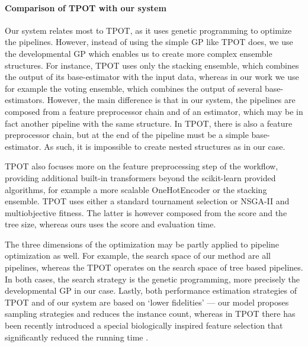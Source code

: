 \paragraph{Comparison of TPOT with our system}


Our system relates most to TPOT, as it uses genetic programming to optimize
the pipelines. However, instead of using the simple GP like TPOT does, we use
the developmental GP which enables us to create more complex ensemble
structures. For instance, TPOT uses only the stacking ensemble, which combines the
output of its base-estimator with the input data, whereas in our work we use for
example the voting ensemble, which combines the output of several base-estimators.
However, the main difference is that in our system, the pipelines are composed
from a feature preprocessor chain and of an estimator, which may be in fact another
pipeline with the same structure. In TPOT, there is also a feature preprocessor
chain, but at the end of the pipeline must be a simple base-estimator. As such, it
is impossible to create nested structures as in our case.

TPOT also focuses more on the feature preprocessing step of the 
workflow, providing additional built-in transformers beyond the scikit-learn 
provided algorithms, for example a more scalable OneHotEncoder or the stacking
ensemble. TPOT uses either a standard tournament selection or 
NSGA-II and multiobjective fitness. The latter is however composed from the 
score and the tree size, whereas ours uses the score and evaluation time.

The three dimensions of the optimization may be partly applied to pipeline
optimization as well. For example, the search space of our method are all pipelines,
whereas the TPOT operates on the search space of tree based pipelines. In both cases,
the search strategy is the genetic programming, more precisely the developmental GP
in our case. Lastly, both performance estimation strategies of TPOT and of our
system are based on `lower fidelities' --- our model proposes sampling strategies and
reduces the instance count, whereas in TPOT there has been recently introduced a
special biologically inspired feature selection that significantly reduced the
running time \citep{Le502484}.